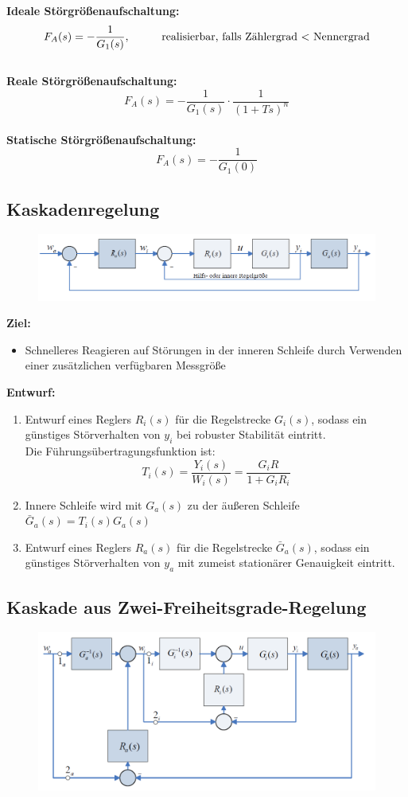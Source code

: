 \documentclass[10pt,a4paper]{article}
\newcommand{\tab}[1][1]{\hspace*{#1cm}}
\begin{document}
\textbf{Ideale Störgrößenaufschaltung:}
$$
	F_A(s) = -\frac{1}{G_1(s)}, \tab \text{realisierbar, falls Zählergrad $<$ Nennergrad}
$$ ~\\

\textbf{Reale Störgrößenaufschaltung:}
$$
	F_A(s) = -\frac{1}{G_1(s)} ⋅ \frac{1}{(1 + Ts)^n}
$$ ~\\

\textbf{Statische Störgrößenaufschaltung:}
$$
	F_A(s) = -\frac{1}{G_1(0)}
$$

\subsection{Kaskadenregelung}
\begin{figure}[H]
	\includegraphics[width=0.8\columnwidth]{imgs/abb7_5.png}
\end{figure}

\textbf{Ziel:}
\begin{itemize}
	\item Schnelleres Reagieren auf Störungen in der inneren Schleife durch Verwenden einer zusätzlichen verfügbaren Messgröße
\end{itemize}

\textbf{Entwurf:}
\begin{enumerate}
	\item Entwurf eines Reglers $R_i(s)$ für die Regelstrecke $G_i(s)$, sodass ein günstiges Störverhalten von $y_i$ bei robuster Stabilität eintritt. \\
	Die Führungsübertragungsfunktion ist:
	$$
		T_i(s) = \frac{Y_i(s)}{W_i(s)} = \frac{G_i R}{1 + G_i R_i}
	$$
	\item Innere Schleife wird mit $G_a(s)$ zu der äußeren Schleife $\bar{G}_a(s) = T_i(s)G_a(s)$
	\item Entwurf eines Reglers $R_a(s)$ für die Regelstrecke $\bar G_a(s)$, sodass ein günstiges Störverhalten von $y_a$ mit zumeist stationärer Genauigkeit eintritt. \\
\end{enumerate}

\subsection{Kaskade aus Zwei-Freiheitsgrade-Regelung}
\begin{figure}[H]
	\includegraphics[width=0.8\columnwidth]{imgs/abb7_8.png}
\end{figure}
\end{document}
